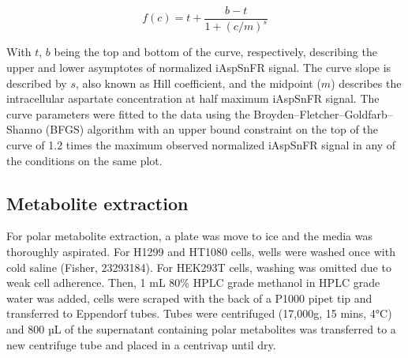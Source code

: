 \documentclass[9pt,lineno]{elife}
\begin{document}
$$
f(c) = t + \frac{b - t}{1 + (c/m)^s}
$$

With $t$, $b$ being the top and bottom of the curve, respectively, describing the upper and lower asymptotes of normalized iAspSnFR signal.
The curve slope is described by $s$, also known as Hill coefficient, and the midpoint ($m$) describes the intracellular aspartate concentration at half maximum iAspSnFR signal.
The curve parameters were fitted to the data using the Broyden–Fletcher–Goldfarb–Shanno (BFGS) algorithm with an upper bound constraint on the top of the curve of 1.2 times the maximum observed normalized iAspSnFR signal in any of the conditions on the same plot.

\subsection{Metabolite extraction}
For polar metabolite extraction, a plate was move to ice and the media was thoroughly aspirated.
For H1299 and HT1080 cells, wells were washed once with cold saline (Fisher, 23293184).
For HEK293T cells, washing was omitted due to weak cell adherence. Then, 1 mL 80\% HPLC grade methanol in HPLC grade water was added, cells were scraped with the back of a P1000 pipet tip and transferred to Eppendorf tubes.
Tubes were centrifuged (17,000g, 15 mins, 4°C) and 800 µL of the supernatant containing polar metabolites was transferred to a new centrifuge tube and placed in a centrivap until dry.
\end{document}
